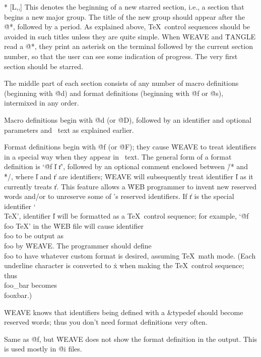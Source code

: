 \@* [\overline L,\oP,\oT] This denotes the beginning of a new starred
section, i.e., a section that begins a new major group. The title of the new
group should appear after the \.{@*}, followed by a period. As explained
above, \TeX\ control sequences should be avoided in such titles unless
they are quite simple. When \.{WEAVE} and \.{TANGLE} read a \.{@*}, they
print an asterisk on the terminal
followed by the current section number, so that the user
can see some indication of progress. The very first section should be starred.

%
\yskip\noindent
The middle part of each section consists of any number of
macro definitions (beginning with \.{@d}) and format definitions (beginning
with \.{@f} or \.{@s}), intermixed in any order.

\@d [\oP,\oT] Macro definitions begin with \.{@d} (or \.{@D}), followed by
an identifier and optional parameters and \Cee\ text as explained earlier.

\@f [\oP,\oT] Format definitions begin with \.{@f} (or \.{@F}); they cause
\.{WEAVE} to treat identifiers in a special way when they appear in
\Cee\ text. The general form of a format definition is `\.{@f} \|l
\|r', followed by an optional comment enclosed between
\.{/*} and \.{*/}, where \|l and \|r
are identifiers; \.{WEAVE} will subsequently treat identifier \|l as it
currently treats \|r. This feature allows a \.{WEB} programmer to invent
new reserved words and/or to unreserve some of \Cee's reserved
identifiers. If \|r is the special identifier `\\{TeX}', identifier \|l
will be formatted as a \TeX\ control sequence; for example,
`\.{@f foo TeX}' in the \.{WEB} file will cause identifier \\{foo} to
be output as \.{\\foo} by \.{WEAVE}. The programmer should define
\.{\\foo} to have whatever custom format is desired, assuming \TeX\
math mode. (Each underline
character is converted to \.{x} when making the \TeX\ control sequence;
thus \\{foo\_bar} becomes \.{\\fooxbar}.)

\more \.{WEAVE} knows that identifiers being
defined with a \&{typedef} should become reserved words; thus you
don't need format definitions very often.

\@s [\oP,\oT] Same as \.{@f}, but \.{WEAVE} does not show the format
definition in the output. This is used mostly in \.{@i} files.

